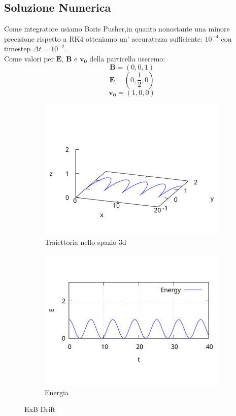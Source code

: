 \documentclass[11pt]{article}
\begin{document}
\subsection{Soluzione Numerica}
Come integratore usiamo Boris Pusher,in quanto nonostante una minore precisione rispetto a RK4 otteniamo un' accuratezza sufficiente: $10^{-4}$ con timestep $\Delta t = 10^{-2}$.\\
Come valori per $\mathbf{E}$, $\mathbf{B}$ e $\mathbf{v_0}$ della particella useremo:
\begin{equation}\mathbf{B}=(0,0,1) \end{equation}
\begin{equation}\mathbf{E}=(0,\frac{1}{2},0) \end{equation}
\begin{equation}\mathbf{v_0} = (1,0,0)\end{equation}
\begin{figure}[ht]
\begin{subfigure}{.5\textwidth}
  \centering
  \includegraphics[width=.9\linewidth]{img/3dposizionedrift.png}  
  \caption{Traiettoria nello spazio 3d}
\end{subfigure}
\begin{subfigure}{.5\textwidth}
  \centering
  \includegraphics[width=.9\linewidth]{img/energia.png}  
  \caption{Energia}
\end{subfigure}
\caption{ExB Drift}
\end{figure}%
\end{document}
